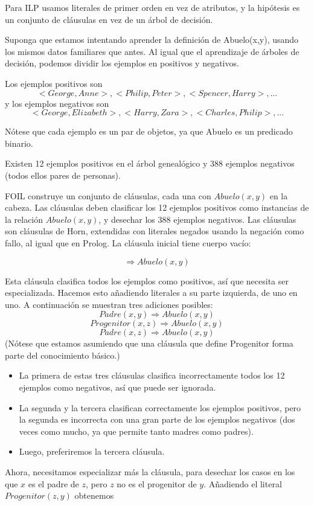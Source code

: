 \documentclass[12 pt, a4paper]{article}
\begin{document}
				Para ILP usamos literales de primer orden en vez de atributos, y la hipótesis es un conjunto de cláusulas en vez de un árbol de decisión. 

				Suponga que estamos intentando aprender la definición de Abuelo(x,y), usando los mismos datos familiares que antes. Al igual que el aprendizaje de árboles de decisión, podemos dividir los ejemplos en positivos y negativos. 

				Los ejemplos positivos son
					$$<George, Anne>, <Philip, Peter>, <Spencer, Harry>, ...$$
				y los ejemplos negativos son
					$$<George, Elizabeth>, <Harry, Zara>, <Charles, Philip>, ...$$
				
				Nótese que cada ejemplo es un par de objetos, ya que Abuelo es un predicado binario.

				Existen 12 ejemplos positivos en el árbol genealógico y 388 ejemplos negativos (todos ellos pares de personas).

				FOIL construye un conjunto de cláusulas, cada una con $Abuelo(x,y)$ en la cabeza. Las cláusulas deben clasificar los 12 ejemplos positivos como instancias de la relación $Abuelo(x,y)$, y desechar los 388 ejemplos negativos. Las cláusulas son cláusulas de Horn, extendidas con literales negados usando la negación como fallo, al igual que en Prolog. La cláusula inicial tiene cuerpo vacío:
				
					$$\Rightarrow Abuelo(x,y)$$
				
				Esta cláusula clasifica todos los ejemplos como positivos, así que necesita ser especializada. Hacemos esto añadiendo literales a su parte izquierda, de uno en uno. A continuación se muestran tres adiciones posibles:
					$$Padre(x, y) \Rightarrow Abuelo(x, y)$$
					$$Progenitor(x, z) \Rightarrow Abuelo(x, y)$$
					$$Padre(x, z)\Rightarrow Abuelo(x, y)$$
				(Nótese que estamos asumiendo que una cláusula que define Progenitor forma parte del conocimiento básico.) 
				
				\begin{itemize}
					\item La primera de estas tres cláusulas clasifica incorrectamente todos los 12 ejemplos como negativos, así que puede ser ignorada.\\
					\item La segunda y la tercera clasifican correctamente los ejemplos positivos, pero la segunda es incorrecta con una gran parte de los ejemplos negativos (dos veces como mucho, ya que permite tanto madres como padres).\\
					\item Luego, preferiremos la tercera cláusula.\\
				\end{itemize}	
				Ahora, necesitamos especializar más la cláusula, para desechar los casos en los que $x$ es el padre de $z$, pero $z$ no es el progenitor de $y$. Añadiendo el literal $Progenitor(z,y)$ obtenemos
				
\end{document}
